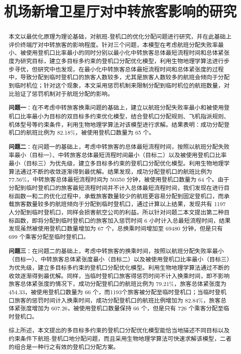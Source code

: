 \documentclass[bwprint]{gmcmthesis}
\title{机场新增卫星厅对中转旅客影响的研究}
\numberwithin{figure}{section}
\begin{document}
 \maketitle
 \begin{abstract}
本文以最优化原理为理论基础，对航班-登机口的优化分配问题进行研究，并在此基础上评价终端厅对中转旅客的影响程度。针对三个问题，本模型在考虑航班分配失败率最小、被使用登机口比率最小的同时分别以最小化中转旅客总体最短流程时间和总体紧张度为研究目标，建立多目标多约束的登机口分配优化模型，利用生物地理学算法进行步步寻优，但研究中也发现，在最小化中转旅客总体最短流程时间和总体紧张度的过程中，导致分配到临时登机口的旅客人数较多，尤其是旅客人数较多的航班会倾向于分配到临时机位；针对这个现象，本文采用惩罚机制来限制分配到临时机位的航班数量，对比验证了惩罚机制对于航班分配的影响。

\textbf{问题一}：在不考虑中转旅客换乘问题的基础上，建立以航班分配失败率最小和被使用登机口比率最小为目标的双目标多约束优化模型，结合登机口分配规则、飞机指派规则、机体型号等约束条件，利用生物地理学算法对该模型进行求解。结果表明：成功分配登机口的航班比例为 82.18\%，被使用登机口数量为 65 个。

\textbf{问题二}：在问题一的基础上，考虑中转旅客的总体最短流程时间，按照以航班分配失败率最小（目标一）、中转旅客总体最短流程时间最小（目标二）以及被使用登机口比率最小（目标三）为优先级，建立多目标多约束的登机口分配优化模型。利用生物地理学算法通过不断的收敛逐渐得到最优解。结果发现，成功分配登机口的航班比例为 77.56\%，中转旅客总体最短流程时间为 50350 分钟，被使用登机口数量为 64 个。由于分配到临时登机口的旅客最短流程时间并不计入总体最短流程时间，我们发现在进行目标函数一和二的优化过程中，承载旅客数量较少的航班更容易分配到固定登机口，而承载旅客数量较多的航班倾向于分配到临时登机口，通过计算以上结果，发现共有 1197 人分配到临时登机口，同样会损害航空公司的利益。所以针对问题二本文提出第二种目标函数，即将分配到临时登机口的旅客加入惩罚时间 6 小时计入总最短流程时间，结果发现虽然被使用登机口数量增加为 67 个，总换乘时间增加至 69480 分钟，但是只有 699 个乘客分配至临时登机口。

\textbf{问题三}：在问题二的基础上，考虑中转旅客的换乘时间，按照以航班分配失败率最小（目标一）、中转旅客总体紧张度最小（目标二）以及被使用登机口比率最小（目标三）为优先级，建立多目标多约束的登机口分配优化模型。利用生物地理学算法通过不断的收敛逐渐得到最优解。同样，当临时登机口旅客得惩罚时间不计入换乘时间，即不影响旅客总体紧张度的情况下，成功分配登机口的航班比例为 79.21\%，旅客总体紧张度为 454.33，被使用登机口数量为 66 个，而1193个旅客被分配至临时登机口；当临时登机口旅客的惩罚时间计入换乘时间，成功分配登机口的航班比例增加为 82.84\%，旅客总体紧张度增加为 607.26，被使用登机口数量保持 66 个，但是只有 726 个乘客分配至临时登机口。

综上所述，本文提出的多目标多约束的登机口分配优化模型能恰当地描述不同目标以及约束条件下航班-登机口地分配问题，而且采用生物地理学算法可快速求解该模型，二者的组合是一种行之有效的登机口分配方案。


\end{abstract}
\end{document}
